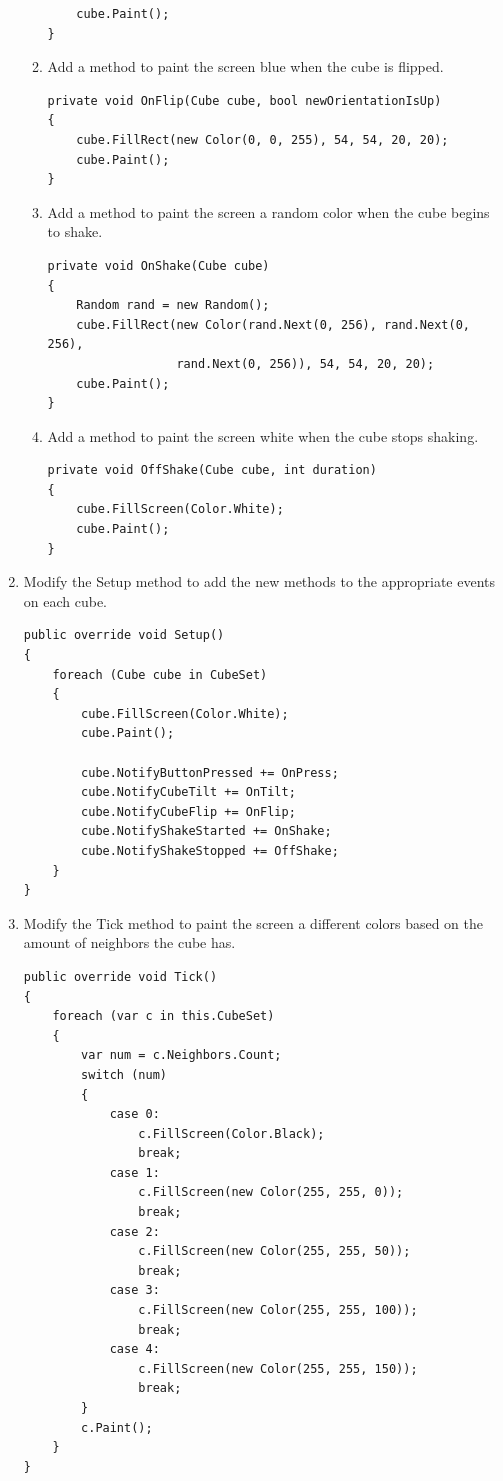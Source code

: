 \documentclass[12pt]{article}
\begin{document}
\begin{enumerate}
\begin{enumerate}
\begin{verbatim}
    cube.Paint();
}
\end{verbatim}
\item Add a method to paint the screen blue when the cube is flipped.
\begin{verbatim}
private void OnFlip(Cube cube, bool newOrientationIsUp)
{
    cube.FillRect(new Color(0, 0, 255), 54, 54, 20, 20);
    cube.Paint();
}
\end{verbatim}
\item Add a method to paint the screen a random color when the cube begins to shake.
\begin{verbatim}
private void OnShake(Cube cube)
{
    Random rand = new Random();
    cube.FillRect(new Color(rand.Next(0, 256), rand.Next(0, 256),
                  rand.Next(0, 256)), 54, 54, 20, 20);
    cube.Paint();
}
\end{verbatim}
\item Add a method to paint the screen white when the cube stops shaking.
\begin{verbatim}
private void OffShake(Cube cube, int duration)
{
    cube.FillScreen(Color.White);
    cube.Paint();
}
\end{verbatim}
\end{enumerate}
\item Modify the Setup method to add the new methods to the appropriate events on each cube.
\begin{verbatim}
public override void Setup()
{
    foreach (Cube cube in CubeSet)
    {
        cube.FillScreen(Color.White);
        cube.Paint();

        cube.NotifyButtonPressed += OnPress;
        cube.NotifyCubeTilt += OnTilt;
        cube.NotifyCubeFlip += OnFlip;
        cube.NotifyShakeStarted += OnShake;
        cube.NotifyShakeStopped += OffShake;
    }
}
\end{verbatim}
\item Modify the Tick method to paint the screen a different colors based on the amount of neighbors the cube has.
\begin{verbatim}
public override void Tick()
{
    foreach (var c in this.CubeSet)
    {
        var num = c.Neighbors.Count;
        switch (num)
        {
            case 0:
                c.FillScreen(Color.Black);
                break;
            case 1:
                c.FillScreen(new Color(255, 255, 0));
                break;
            case 2:
                c.FillScreen(new Color(255, 255, 50));
                break;
            case 3:
                c.FillScreen(new Color(255, 255, 100));
                break;
            case 4:
                c.FillScreen(new Color(255, 255, 150));
                break;
        }
        c.Paint();
    }
}
\end{verbatim}
\end{enumerate}
\end{document}
